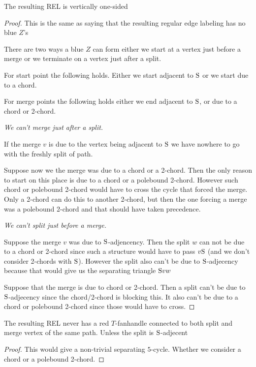     \begin{lemma}
      \label{lm:sweep:vertOnsided}
      The resulting REL is vertically one-sided
    \end{lemma}
    \begin{proof}
      This is the same as saying that the resulting regular edge labeling has no blue $Z$'s

      There are two ways a blue $Z$ can form either we start at a vertex just before a merge or we terminate on a vertex just after a split.

      For start point the following holds. Either we start adjacent to $\mathrm{S}$ or we start due to a chord.

      For merge points the following holds either we end adjacent to $\mathrm{S}$, or due to a chord or 2-chord.

      \vspace{2ex}
      \emph{We can't merge just after a split.}

      If the merge $v$ is due to the vertex being adjacent to $\mathrm{S}$ we have nowhere to go with the freshly split of path. 

      Suppose now we the merge was due to a chord or a 2-chord. Then the only reason to start on this place is due to a chord or a polebound 2-chord. However such chord or polebound 2-chord would have to cross the cycle that forced the merge. Only a 2-chord can do this to another 2-chord, but then the one forcing a merge was a polebound 2-chord and that should have taken precedence.


      \vspace{2ex}
      \emph{We can't split just before a merge.}

      Suppose the merge $v$ was due to $\mathrm{S}$-adjencency. Then the split $w$ can not be due to a chord or 2-chord since such a structure would have to pass $v \mathrm{S}$ (and we don't consider 2-chords with $\mathrm{S}$). However the split also can't be due to $\mathrm{S}$-adjecency because that would give us the separating triangle $\mathrm{S} v w$

      Suppose that the merge is due to chord or 2-chord. Then a split can't be due to $\mathrm{S}$-adjecency since the chord/2-chord is blocking this. It also can't be due to a chord or polebound 2-chord since those would have to cross.
    \end{proof}

    \begin{lemma}
      \label{lm:uni:noTfan above whole path}
      The resulting REL never has a red $T$-fanhandle connected to both split and merge vertex of the same path. Unless the split is $\mathrm{S}$-adjecent
    \end{lemma}
    \begin{proof}
        This would give a non-trivial separating $5$-cycle. Whether we consider a chord or a polebound 2-chord.
    \end{proof}

